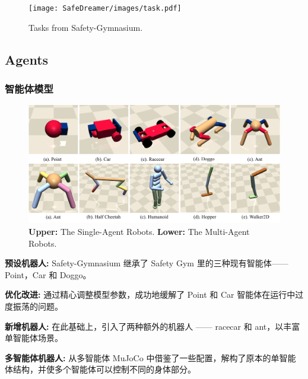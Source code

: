 \documentclass[10pt,mathserif]{beamer}%
\begin{document}
\begin{frame}[t, fragile]
\begin{minipage}[bp]{\textwidth}
\begin{figure}
  \centering
  \texttt{[image: SafeDreamer/images/task.pdf]}
  \vspace*{-0.8\baselineskip}
  \caption{Tasks from Safety-Gymnasium.}
  \label{fig:task}
\end{figure}

\end{minipage}

\end{frame}
\subsection{Agents}
\begin{frame}[t,fragile]
    \frametitle{智能体模型}
\begin{figure}[ht]
  \centering
  \includegraphics[width=0.9\linewidth]{Safety-Gymnasium/assets/main-paper/agent.pdf}
  \caption{\textbf{Upper: }The Single-Agent Robots. \textbf{Lower:} The Multi-Agent Robots.}
  \label{pic:agent}
\end{figure}
\vspace{-0.5cm}
\begin{itemize}
{
\fontsize{8pt}{9.6pt}\selectfont
    \item \textbf{预设机器人:} Safety-Gymnasium 继承了 Safety Gym 里的三种现有智能体——Point，Car 和 Doggo。
    \item \textbf{优化改进:} 通过精心调整模型参数，成功地缓解了 Point 和 Car 智能体在运行中过度振荡的问题。
    \item \textbf{新增机器人:} 在此基础上，引入了两种额外的机器人 —— racecar 和 ant，以丰富单智能体场景。
    \item \textbf{多智能体机器人:} 从多智能体 MuJoCo 中借鉴了一些配置，解构了原本的单智能体结构，并使多个智能体可以控制不同的身体部分。
}
\end{itemize}
\end{frame}
\end{document}

